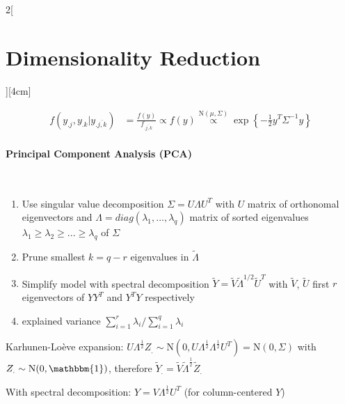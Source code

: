 \documentclass[8pt]{extarticle}
\begin{document}
\begin{multicols}{2}[\section{Dimensionality Reduction}][4cm]
\begin{Proof}
\vspace{-1.5em}
\begin{align*}
f(y_{.j}, y_{.k}|y_{.\overline{j,k}}) &= \frac{f(y)}{f_{.\overline{j,k}}} \propto f(y)
\overset{\mathrm{N}(\mu,\Sigma)}{\propto} \exp\left\{-\frac{1}{2}y^T\Sigma^{-1}y\right\}
\end{align*}
\end{Proof}

\paragraph{Principal Component Analysis (PCA)} \ \\
\begin{enumerate}
\item Use singular value decomposition $\Sigma = U \Lambda U^T$
with $U$ matrix of orthonomal eigenvectors and $\Lambda = diag(\lambda_1,...,\lambda_q)$ matrix of sorted eigenvalues $\lambda_1 \geq \lambda_2 \geq ... \geq \lambda_q$ of $\Sigma$
\item Prune smallest $k=q-r$ eigenvalues in $\tilde{\Lambda}$
\item Simplify model with spectral decomposition $\tilde{Y} = \tilde{V}\tilde{\Lambda}^{1/2}\tilde{U}^T$ with $\tilde{V}$, $\tilde{U}$ first $r$ eigenvectors of $YY^T$ and $Y^TY$ respectively
\item explained variance $\sum_{i=1}^{r}\lambda_i/\sum_{i=1}^{q}\lambda_i$
\end{enumerate}

\begin{Proof}
Karhunen-Lo\`{e}ve expansion: $U\Lambda^{\frac{1}{2}}Z_{.} \sim \mathrm{N}(0, U\Lambda^{\frac{1}{2}}\Lambda^{\frac{1}{2}}U^T) = \mathrm{N}(0,\Sigma)$ with $Z_{.} \sim \mathrm{N}(0,\mathbbm{1})$, therefore $\tilde{Y}_{.} = \tilde{V}\tilde{\Lambda}^{\frac{1}{2}}\tilde{Z}_{.}$

\noindent With spectral decomposition: $Y=V\Lambda^{\frac{1}{2}}U^T$ (for column-centered $Y$)

\end{Proof}

\end{multicols}
\end{document}
